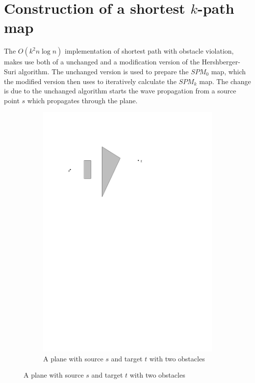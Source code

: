 \section{Construction of a shortest $k$-path map}

The $O(k^2 n \log n)$ implementation of shortest path with obstacle violation, makes use 
both of a unchanged and a modification version of the Hershberger-Suri algorithm. The 
unchanged version is used to prepare the $SPM_0$ map, which the modified version then 
uses to iteratively calculate the $SPM_k$ map. The change is due to the unchanged 
algorithm starts the wave propagation from a source point $s$ which propagates through 
the plane. 

\begin{figure}[H]
\centering
\begin{subfigure}{.5\textwidth}
  \centering 
  \includegraphics[width=.95\linewidth]{figures/prespm0.pdf}
  \caption{A plane with source $s$ and target $t$ with two obstacles}

\end{subfigure}
\end{figure}
